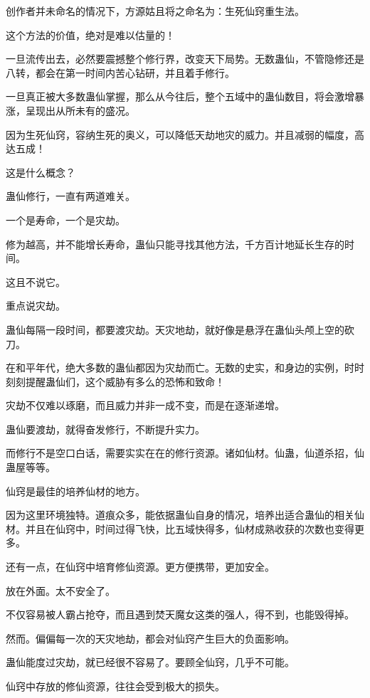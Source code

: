 
\begin{this_body}

创作者并未命名的情况下，方源姑且将之命名为：生死仙窍重生法。

这个方法的价值，绝对是难以估量的！

一旦流传出去，必然要震撼整个修行界，改变天下局势。无数蛊仙，不管隐修还是八转，都会在第一时间内苦心钻研，并且着手修行。

一旦真正被大多数蛊仙掌握，那么从今往后，整个五域中的蛊仙数目，将会激增暴涨，呈现出从所未有的盛况。

因为生死仙窍，容纳生死的奥义，可以降低天劫地灾的威力。并且减弱的幅度，高达五成！

这是什么概念？

蛊仙修行，一直有两道难关。

一个是寿命，一个是灾劫。

修为越高，并不能增长寿命，蛊仙只能寻找其他方法，千方百计地延长生存的时间。

这且不说它。

重点说灾劫。

蛊仙每隔一段时间，都要渡灾劫。天灾地劫，就好像是悬浮在蛊仙头颅上空的砍刀。

在和平年代，绝大多数的蛊仙都因为灾劫而亡。无数的史实，和身边的实例，时时刻刻提醒蛊仙们，这个威胁有多么的恐怖和致命！

灾劫不仅难以琢磨，而且威力并非一成不变，而是在逐渐递增。

蛊仙要渡劫，就得奋发修行，不断提升实力。

而修行不是空口白话，需要实实在在的修行资源。诸如仙材。仙蛊，仙道杀招，仙蛊屋等等。

仙窍是最佳的培养仙材的地方。

因为这里环境独特。道痕众多，能依据蛊仙自身的情况，培养出适合蛊仙的相关仙材。并且在仙窍中，时间过得飞快，比五域快得多，仙材成熟收获的次数也变得更多。

还有一点，在仙窍中培育修仙资源。更方便携带，更加安全。

放在外面。太不安全了。

不仅容易被人霸占抢夺，而且遇到焚天魔女这类的强人，得不到，也能毁得掉。

然而。偏偏每一次的天灾地劫，都会对仙窍产生巨大的负面影响。

蛊仙能度过灾劫，就已经很不容易了。要顾全仙窍，几乎不可能。

仙窍中存放的修仙资源，往往会受到极大的损失。


\end{this_body}
